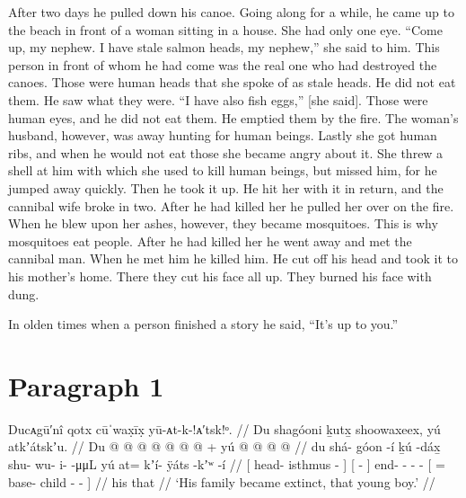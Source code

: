 After two days he pulled down his canoe.
Going along for a while,
he came up to the beach in front of
a woman sitting in a house.
She had only one eye. 
\qqk{}“Come up, my nephew.
I have stale salmon heads, my nephew,”
she said to him.
This person in front of whom he had come was the real one who had destroyed the canoes.
Those were human heads that she spoke of as stale heads.
He did not eat them.
He saw what they were.
\qqk{}“I have also fish eggs,” [she said].
Those were human eyes, and he did not eat them.
He emptied them by the fire.
The woman’s husband, however, was away
hunting for human beings.
Lastly she got human ribs,
and when he would not eat those she became angry about it.
She threw a shell at him with which she used to kill human beings, but missed him,
for he jumped away quickly.
Then he took it up.
He hit her with it in return,
and the cannibal wife
broke in two.
After he had killed her he pulled her over on the fire.
When he blew upon her ashes, however, they became mosquitoes.
This is why mosquitoes eat people.
After he had killed her he went away
and met the cannibal man.
When he met him he killed him.
He cut off his head
and took it to his mother’s home.
There they cut his face all up.
They burned his face with dung.

In olden times when a person finished a story he said,
\qqk{}“It’s up to you.”

\clearpage
\section{Paragraph 1}\label{sec:91-para-1}

\ex\label{ex:91-1-relatives-died-out}%
%
\begingl
	\glpreamble	Ducᴀgū′nî qotx cūˈwax̣īx̣ yū-ᴀt-k-!ᴀ′tsk!ᵒ. //
	\glpreamble	Du shagóoni ḵutx̱ shoowaxeex, yú atkʼátskʼu. //
	\gla	{} Du  @ {} @ {} {}
		{}  @ {} {}  @ {} @ {} @ {} @ {} +
		{} yú  @ {} @ {} @ {} @ {} {} //
	\glb	{} du shá- góon -í {}
		{} ḵú -dáx̱ {} shu- wu- i-  -μμL
		{} yú at= kʼí- ÿáts -kʼʷ -í {} //
	\glc	{}[  head- isthmus - {}]
		{}[  - {}] end- - -  -
		{}[  = base- child - - {}] //
	\gld	{} his  {} {} {} 
		{}  {} {}  {} {} {} {} 
		{} that  {} {} {} {} {} //
	\glft	‘His family became extinct, that young boy.’
		//
\endgl
\xe

